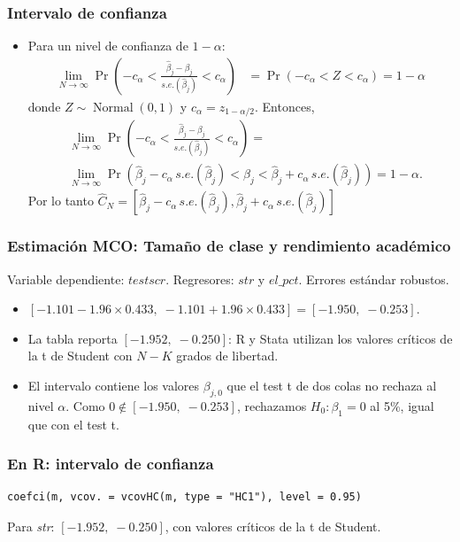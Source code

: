 \documentclass[t, compress, spanish, aspectratio=169]{beamer}
\DeclareMathOperator{\N}{Normal}
\begin{document}
\begin{frame}
    \frametitle{Intervalo de confianza}
    \begin{itemize}
        \item Para un nivel de confianza de $1-\alpha$:
        \begin{align*}
        \lim_{N\to \infty} \Pr\left(-c_\alpha<\frac{\hat \beta_j-\beta_j}{s.e.(\hat \beta_j)}< c_\alpha\right)&=\Pr\left(-c_\alpha<Z< c_\alpha\right)=1-\alpha
        \end{align*}
        donde $Z\sim \N(0,1)$ y $c_\alpha=z_{1-\alpha/2}$.
		Entonces,
        \begin{align*}
        &\lim_{N\to \infty} \Pr\left(-c_\alpha<\frac{\hat \beta_j-\beta_j}{s.e.(\hat \beta_j)}< c_\alpha\right)=\\
        &\lim_{N\to \infty}\Pr\left(\hat \beta_j-c_\alpha \, s.e.(\hat \beta_j)<\beta_j< \hat \beta_j+c_\alpha \,s.e.(\hat \beta_j)
        \right) =1-\alpha.
        \end{align*}
        Por lo tanto $\hat C_N=[\hat \beta_j-c_\alpha \,s.e.(\hat \beta_j),\hat \beta_j+c_\alpha \,s.e.(\hat \beta_j)]$
    \end{itemize}
\end{frame}


\begin{frame}
\frametitle{Estimaci\'on MCO: Tama\~no de clase y rendimiento acad\'emico}
Variable dependiente: $testscr$. Regresores: $str$ y $el\_pct$. Errores est\'andar robustos.
\medskip
\begin{center}
\footnotesize

\end{center}
\begin{itemize}
    \item $[-1.101 - 1.96 \times 0.433,\; -1.101 + 1.96 \times 0.433] = [-1.950,\; -0.253]$.
    \item La tabla reporta $[-1.952,\; -0.250]$: \alert{R y Stata utilizan los valores cr\'iticos de la t de Student} con $N-K$ grados de libertad.
    \item El intervalo contiene los valores $\beta_{j,0}$ que el test t de dos colas no rechaza al nivel $\alpha$. Como $0\notin[-1.950,\; -0.253]$, rechazamos $H_0:\beta_1=0$ al 5\%, igual que con el test t.
\end{itemize}
\end{frame}
\begin{frame}[fragile]
	\frametitle{En R: intervalo de confianza}
\footnotesize
\begin{verbatim}
coefci(m, vcov. = vcovHC(m, type = "HC1"), level = 0.95)
\end{verbatim}
\small
Para \emph{str}: $[-1.952,\; -0.250]$, con valores cr\'iticos de la t de Student.
\end{frame}
\end{document}
